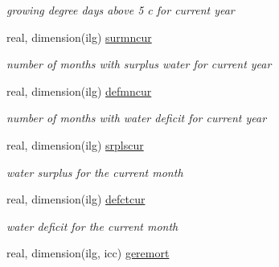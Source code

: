 \begin{DoxyCompactItemize}
\begin{DoxyCompactList}\small\item\em growing degree days above 5 c for current year \end{DoxyCompactList}\item 
\hypertarget{structctem__statevars_1_1veg__gat_a19c2f10170e4d16e66258a5441c5f9be}{}real, dimension(ilg) \hyperlink{structctem__statevars_1_1veg__gat_a19c2f10170e4d16e66258a5441c5f9be}{surmncur}\label{structctem__statevars_1_1veg__gat_a19c2f10170e4d16e66258a5441c5f9be}

\begin{DoxyCompactList}\small\item\em number of months with surplus water for current year \end{DoxyCompactList}\item 
\hypertarget{structctem__statevars_1_1veg__gat_a97909b6438f3810938c18331463e1ddc}{}real, dimension(ilg) \hyperlink{structctem__statevars_1_1veg__gat_a97909b6438f3810938c18331463e1ddc}{defmncur}\label{structctem__statevars_1_1veg__gat_a97909b6438f3810938c18331463e1ddc}

\begin{DoxyCompactList}\small\item\em number of months with water deficit for current year \end{DoxyCompactList}\item 
\hypertarget{structctem__statevars_1_1veg__gat_a4651f0a8f8b38aaf3b5037396a38e05c}{}real, dimension(ilg) \hyperlink{structctem__statevars_1_1veg__gat_a4651f0a8f8b38aaf3b5037396a38e05c}{srplscur}\label{structctem__statevars_1_1veg__gat_a4651f0a8f8b38aaf3b5037396a38e05c}

\begin{DoxyCompactList}\small\item\em water surplus for the current month \end{DoxyCompactList}\item 
\hypertarget{structctem__statevars_1_1veg__gat_ae3a96d00e3a3924a0ce827f515d0ab82}{}real, dimension(ilg) \hyperlink{structctem__statevars_1_1veg__gat_ae3a96d00e3a3924a0ce827f515d0ab82}{defctcur}\label{structctem__statevars_1_1veg__gat_ae3a96d00e3a3924a0ce827f515d0ab82}

\begin{DoxyCompactList}\small\item\em water deficit for the current month \end{DoxyCompactList}\item 
\hypertarget{structctem__statevars_1_1veg__gat_a7fee4c4cc3dbd81ba8eb5a1ed177d25e}{}real, dimension(ilg, icc) \hyperlink{structctem__statevars_1_1veg__gat_a7fee4c4cc3dbd81ba8eb5a1ed177d25e}{geremort}\label{structctem__statevars_1_1veg__gat_a7fee4c4cc3dbd81ba8eb5a1ed177d25e}


\end{DoxyCompactItemize}
